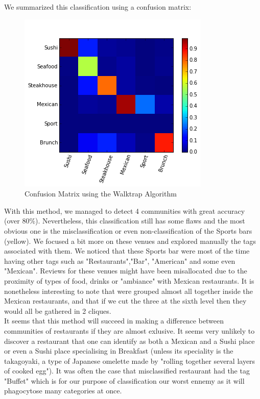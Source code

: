 \documentclass[twoside]{article}
\begin{document}
\begin{multicols}{2}
\noindent We summarized this classification using a confusion matrix: 
\begin{figure}[H]
\centering
\includegraphics[width=1\linewidth]{confusion}
\caption{Confusion Matrix using the Walktrap Algorithm}
\end{figure}

\noindent With this method, we managed to detect 4 communities with great accuracy (over 80\%). Nevertheless, this classification still has some flaws and the most obvious one is the misclassification or even non-classification of the Sports bars (yellow). We focused a bit more on these venues and explored manually the tags associated with them. We noticed that these Sports bar were most of the time having other tags such as "Restaurants","Bar", "American" and some even "Mexican". Reviews for these venues might have been misallocated due to the proximity of types of food, drinks or "ambiance" with Mexican restaurants. It is nonetheless interesting to note that were grouped almost all together inside the Mexican restaurants, and that if we cut the three at the sixth level then they would all be gathered in 2 cliques.\\

\noindent It seems that this method will succeed in making a difference between communities of restaurants if they are almost exlusive. It seems very unlikely to discover a restaurant that one can identify as both a Mexican and a Sushi place or even a Sushi place specialising in Breakfast (unless its speciality is the takagoyaki, a type of Japanese omelette made by "rolling together several layers of cooked egg"). It was often the case that misclassified restaurant had the tag "Buffet" which is for our purpose of classification our worst ennemy as it will phagocytose many categories at once.


\end{multicols}
\end{document}
